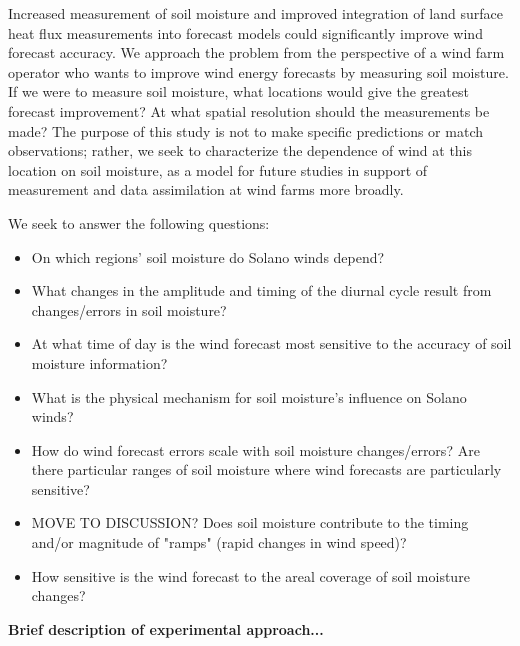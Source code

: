 Increased measurement of soil moisture and improved integration of land surface heat flux measurements into forecast models could significantly improve wind forecast accuracy.  We approach the problem from the perspective of a wind farm operator who wants to improve wind energy forecasts by measuring soil moisture.  If we were to measure soil moisture, what locations would give the greatest forecast improvement?  At what spatial resolution should the measurements be made?  The purpose of this study is not to make specific predictions or match observations; rather, we seek to characterize the dependence of wind at this location on soil moisture, as a model for future studies in support of measurement and data assimilation at wind farms more broadly.

We seek to answer the following questions:
\begin{itemize}
\item On which regions' soil moisture do Solano winds depend?
\item What changes in the amplitude and timing of the diurnal cycle result from changes/errors in soil moisture?
\item At what time of day is the wind forecast most sensitive to the accuracy of soil moisture information?
\item What is the physical mechanism for soil moisture's influence on Solano winds?
\item How do wind forecast errors scale with soil moisture changes/errors?  Are there particular ranges of soil moisture where wind forecasts are particularly sensitive?
\item MOVE TO DISCUSSION? Does soil moisture contribute to the timing and/or magnitude of "ramps" (rapid changes in wind speed)?
\item How sensitive is the wind forecast to the areal coverage of soil moisture changes?
\end{itemize}

\textbf{Brief description of experimental approach...}

%